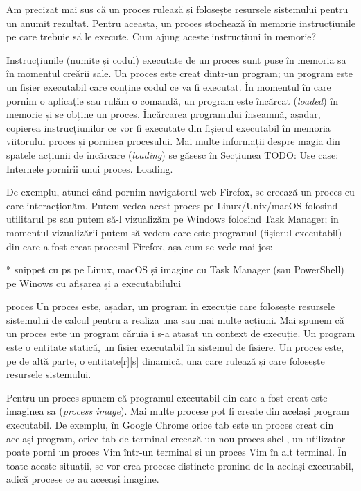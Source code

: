 Am precizat mai sus că un proces rulează și folosește resursele sistemului
pentru un anumit rezultat. Pentru aceasta, un proces stochează în memorie
instrucțiunile pe care trebuie să le execute. Cum ajung aceste instrucțiuni în
memorie?

Instrucțiunile (numite și codul) executate de un proces sunt puse în memoria sa
în momentul creării sale. Un proces este creat dintr-un program; un program este
un fișier executabil care conține codul ce va fi executat. În momentul în care
pornim o aplicație sau rulăm o comandă, un program este încărcat
(\textit{loaded}) în memorie și se obține un proces. Încărcarea programului
înseamnă, așadar, copierea instrucțiunilor ce vor fi executate din fișierul
executabil în memoria viitorului proces și pornirea procesului. Mai multe
informații despre magia din spatele acțiunii de încărcare (\textit{loading}) se
găsesc în Secțiunea TODO: Use case: Internele pornirii unui proces. Loading.

De exemplu, atunci când pornim navigatorul web Firefox, se creează un proces cu
care interacționăm. Putem vedea acest proces pe Linux/Unix/macOS folosind
utilitarul ps sau putem să-l vizualizăm pe Windows folosind Task Manager; în
momentul vizualizării putem să vedem care este programul (fișierul executabil)
din care a fost creat procesul Firefox, așa cum se vede mai jos:

* snippet cu ps pe Linux, macOS și imagine cu Task Manager (sau PowerShell) pe Winows cu afișarea și a executabilului

\begin{definition}{proces}
	Un proces este, așadar, un program în execuție care folosește resursele
	sistemului de calcul pentru a realiza una sau mai multe acțiuni. Mai
	spunem că un proces este un program căruia i s-a atașat un context de
	execuție. Un program este o entitate statică, un fișier executabil în
	sistemul de fișiere. Un proces este, pe de altă parte, o entitate[r][s]
	dinamică, una care rulează și care folosește resursele sistemului.
\end{definition}

Pentru un proces spunem că programul executabil din care a fost creat este
imaginea sa (\textit{process image}). Mai multe procese pot fi create din același program
executabil. De exemplu, în Google Chrome orice tab este un proces creat din
același program, orice tab de terminal creează un nou proces shell, un
utilizator poate porni un proces Vim într-un terminal și un proces Vim în alt
terminal. În toate aceste situații, se vor crea procese distincte pronind de la
același executabil, adică procese ce au aceeași imagine.

